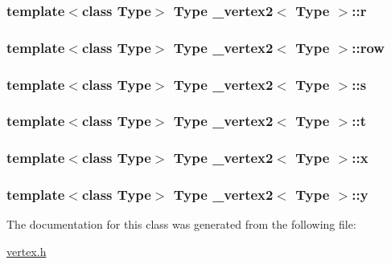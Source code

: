 \hypertarget{class__vertex2_a5a404037c59e0d4c2af8ba301e006cef}{
\subsubsection[{r}]{\setlength{\rightskip}{0pt plus 5cm}template$<$class Type$>$ Type {\bf \+\_\+vertex2}$<$ Type $>$\+::r}}\label{class__vertex2_a5a404037c59e0d4c2af8ba301e006cef}
\hypertarget{class__vertex2_aa0d662a46c73e4c737fe9c09b54412c5}{
\subsubsection[{row}]{\setlength{\rightskip}{0pt plus 5cm}template$<$class Type$>$ Type {\bf \+\_\+vertex2}$<$ Type $>$\+::row}}\label{class__vertex2_aa0d662a46c73e4c737fe9c09b54412c5}
\hypertarget{class__vertex2_a4d6ed656629478ac2f367bec00589ec0}{
\subsubsection[{s}]{\setlength{\rightskip}{0pt plus 5cm}template$<$class Type$>$ Type {\bf \+\_\+vertex2}$<$ Type $>$\+::s}}\label{class__vertex2_a4d6ed656629478ac2f367bec00589ec0}
\hypertarget{class__vertex2_a64f0152747b02f799880ee51111f6316}{
\subsubsection[{t}]{\setlength{\rightskip}{0pt plus 5cm}template$<$class Type$>$ Type {\bf \+\_\+vertex2}$<$ Type $>$\+::t}}\label{class__vertex2_a64f0152747b02f799880ee51111f6316}
\hypertarget{class__vertex2_a34050e835b9dafb02d5a61381bbaa434}{
\subsubsection[{x}]{\setlength{\rightskip}{0pt plus 5cm}template$<$class Type$>$ Type {\bf \+\_\+vertex2}$<$ Type $>$\+::x}}\label{class__vertex2_a34050e835b9dafb02d5a61381bbaa434}
\hypertarget{class__vertex2_a4988efe986242839b52ce5c91889325e}{
\subsubsection[{y}]{\setlength{\rightskip}{0pt plus 5cm}template$<$class Type$>$ Type {\bf \+\_\+vertex2}$<$ Type $>$\+::y}}\label{class__vertex2_a4988efe986242839b52ce5c91889325e}


The documentation for this class was generated from the following file\+:\begin{DoxyCompactItemize}
\item 
\hyperlink{vertex_8h}{vertex.\+h}\end{DoxyCompactItemize}
